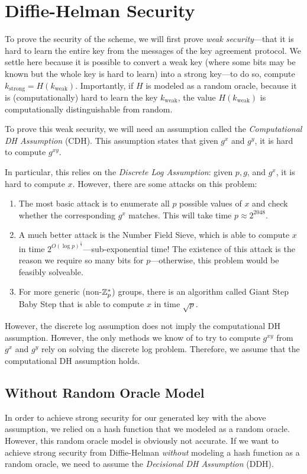 \section{Diffie-Helman Security}
To prove the security of the scheme, we will first prove \emph{weak security}---that it is hard to learn the entire key from the messages of the key agreement protocol. We settle here because it is possible to convert a weak key (where some bits may be known but the whole key is hard to learn) into a strong key---to do so, compute $k_\text{strong} = H(k_\text{weak})$. Importantly, if $H$ is modeled as a random oracle, because it is (computationally) hard to learn the key $k_\text{weak}$, the value $H(k_\text{weak})$ is computationally distinguishable from random.

To prove this weak security, we will need an assumption called the \emph{Computational DH Assumption} (CDH). This assumption states that given $g^x$ and $g^y$, it is hard to compute $g^{xy}$.

In particular, this relies on the \emph{Discrete Log Assumption}: given $p, g$, and $g^x$, it is hard to compute $x$. However, there are some attacks on this problem:

\begin{enumerate}
	\item The most basic attack is to enumerate all $p$ possible values of $x$ and check whether the corresponding $g^x$ matches. This will take time $p \approx 2^{2048}$.
	\item A much better attack is the Number Field Sieve, which is able to compute $x$ in time $2^{O(\log p)^{\frac{1}{3}}}$---sub-exponential time! The existence of this attack is the reason we require so many bits for $p$---otherwise, this problem would be feasibly solveable.
	\item For more generic (non-$\mathbb{Z}_p^*$) groups, there is an algorithm called Giant Step Baby Step that is able to compute $x$ in time $\sqrt{p}$.
\end{enumerate}

However, the discrete log assumption does not imply the computational DH assumption. However, the only methods we know of to try to compute $g^{xy}$ from $g^x$ and $g^y$ rely on solving the discrete log problem. Therefore, we assume that the computational DH assumption holds. 

\subsection{Without Random Oracle Model}
In order to achieve strong security for our generated key with the above assumption, we relied on a hash function that we modeled as a random oracle. However, this random oracle model is obviously not accurate. If we want to achieve strong security from Diffie-Helman \emph{without} modeling a hash function as a random oracle, we need to assume the \emph{Decisional DH Assumption} (DDH).

